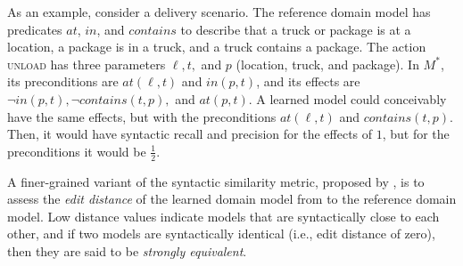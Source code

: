 \documentclass{article}
\theoremstyle{definition}
\theoremstyle{remark}
\newcommand{\realm}{{\ensuremath{M^*}}\xspace}
\newif\ifaddcomments
\newcommand{\roni}[1]{\ifaddcomments{\textcolor{red}{[Roni: #1]}}\fi}
\newcommand{\mauro}[1]{\ifaddcomments{\textcolor{green}{[Mauro: #1]}}\fi}
\newcommand{\gregor}[1]{\ifaddcomments{\textcolor{orange}{[Gregor: #1]}}\fi}
\begin{document}

As an example, consider a delivery scenario.
The reference domain model has predicates $at$, $in$, and $contains$ to describe that a truck or package is at a location, a package is in a truck, and a truck contains a package.
The action \textsc{unload} has three parameters $\ell, t,$ and $p$ (location, truck, and package).
In $\realm$, its preconditions are $\textit{at}(\ell, t)$ and $\textit{in}(p,t)$, and its effects are $\neg \textit{in}(p,t), \neg \textit{contains}(t,p),$ and $\textit{at}(p,t)$.
A learned model could conceivably have the same effects, but with the preconditions $\textit{at}(\ell, t)$ and $\textit{contains}(t,p)$.
Then, it would have syntactic recall and precision for the effects of $1$, but for the preconditions it would be $\frac 1 2$.

A finer-grained variant of the syntactic similarity metric, proposed by \cite{chrpa2023comparing}, is to assess the \emph{edit distance} of the learned domain model from to the reference domain model. Low distance values indicate models that are syntactically close to each other, and if two models are syntactically identical (i.e., edit distance of zero), then they are said to be \textit{strongly equivalent}.







\end{document}
